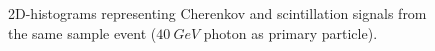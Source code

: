 \begin{figure}
	\centering
	 \quad
	\caption{2D-histograms representing Cherenkov and scintillation signals from the same sample event ($40\ GeV$ photon as primary particle).}
	\label{fig:2Dhist}
\end{figure}

